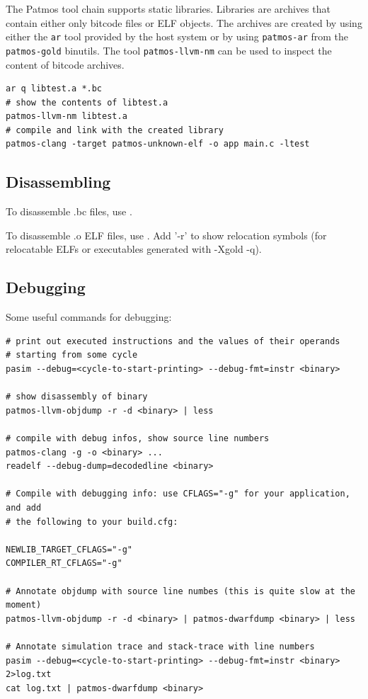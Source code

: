The Patmos tool chain supports static libraries. Libraries are archives that contain
either only bitcode files or ELF objects. The archives are created by using either the \texttt{ar}
tool provided by the host system or by using \texttt{patmos-ar} from the \texttt{patmos-gold} binutils. The tool
\texttt{patmos-llvm-nm} can be used to inspect the content of bitcode archives.

\begin{verbatim}
ar q libtest.a *.bc
# show the contents of libtest.a
patmos-llvm-nm libtest.a
# compile and link with the created library
patmos-clang -target patmos-unknown-elf -o app main.c -ltest
\end{verbatim}


\subsection{Disassembling}

To disassemble .bc files, use .

To disassemble .o ELF files, use . Add '-r' to show relocation symbols
(for relocatable ELFs or executables generated with -Xgold -q).

\subsection{Debugging}

Some useful commands for debugging:

\begin{verbatim}
# print out executed instructions and the values of their operands
# starting from some cycle
pasim --debug=<cycle-to-start-printing> --debug-fmt=instr <binary>

# show disassembly of binary
patmos-llvm-objdump -r -d <binary> | less

# compile with debug infos, show source line numbers
patmos-clang -g -o <binary> ...
readelf --debug-dump=decodedline <binary>

# Compile with debugging info: use CFLAGS="-g" for your application, and add
# the following to your build.cfg:

NEWLIB_TARGET_CFLAGS="-g"
COMPILER_RT_CFLAGS="-g"

# Annotate objdump with source line numbes (this is quite slow at the moment)
patmos-llvm-objdump -r -d <binary> | patmos-dwarfdump <binary> | less

# Annotate simulation trace and stack-trace with line numbers
pasim --debug=<cycle-to-start-printing> --debug-fmt=instr <binary> 2>log.txt
cat log.txt | patmos-dwarfdump <binary>
\end{verbatim}

